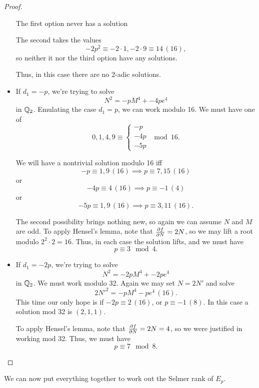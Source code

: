 \documentclass[12pt, a4paper]{amsart}
\begin{document}
\begin{proof}
\begin{itemize}
    The first option never has a solution

    The second takes the values
    \[-2p^2 \equiv -2\cdot 1, -2 \cdot 9 \equiv 14 \, (16), \]
    so neither it nor the third option have any solutions.

    Thus, in this case there are no 2-adic solutions.

    \item If $d_1 = -p$, we're trying to solve
      \[N^2 = -pM^4 + -4pe^4 \] in ${\mathbb Q}_2$. Emulating the case $d_1 = p$, we
      can work modulo 16.
    We must have one of
    \[0, 1, 4, 9 \equiv
      \begin{cases}
        -p \\
        -4p \\
        -5p
      \end{cases} \mod{16}.
    \]

    We will have a nontrivial solution modulo 16 iff 
    \[-p \equiv 1,9 \, (16) \implies p \equiv 7, 15 \, (16)\]
    or
    \[-4p \equiv 4 \, (16) \implies p \equiv -1 \, (4)\]
    or
    \[-5p \equiv 1,9 \, (16) \implies p \equiv 3, 11 \, (16).\]

    The second possibility brings nothing new, so again we can assume $N$ and
    $M$ are odd. To apply Hensel's lemma, note that $\frac{\partial f}{\partial N} = 2N$, so we
    may lift a root modulo $2^2 \cdot 2 = 16$. Thus, in each case the solution
    lifts, and we must have
    \[p \equiv 3 \mod{4}.\]

    \item If $d_1 = -2p$, we're trying to solve
    \[N^2 = -2pM^4 + -2pe^4 \] in ${\mathbb Q}_2$. 
    We must work modulo 32. Again we may set $N = 2N'$ and solve
    \[2N'^2 = -pM^4 - pe^4 \, (16).\]
    This time our only hope is if $-2p \equiv 2 \, (16)$, or $p \equiv -1 \, (8).$
    In this case a solution mod 32 is $(2,1,1).$

    To apply Hensel's lemma, note that $\frac{\partial f}{\partial N} = 2N = 4$, so we were
    justified in working mod 32. Thus, we must have
    \[p \equiv 7 \mod{8}.\]

  \end{itemize}
\end{proof}
We can now put everything together to work out the Selmer rank of $E_p$.
\end{document}
